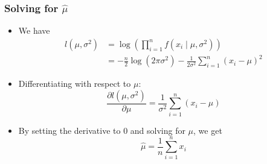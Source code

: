 \documentclass{beamer}
\begin{document}
\begin{frame}
	\frametitle{Solving for $\hat{\mu}$}
	
	
	
	
	\pause
	\begin{itemize}
		\item We have	
		\begin{align*}
			l(\mu, \sigma^2)
			&= \log \left( \prod_{i=1}^{n} f(x_i \mid \mu, \sigma^2) \right)	\\
			&= -\frac{n}{2}\log(2\pi\sigma^2)
			- \frac{1}{2\sigma^2} \sum_{i=1}^{n} (x_i - \mu)^2
		\end{align*}
	\pause
	\item Differentiating with respect to $\mu$:
	$$
	\frac{\partial l(\mu, \sigma^2)}{\partial \mu} = \frac{1}{\sigma^2} \sum_{i=1}^{n} (x_i - \mu)
	$$	
	\pause
	\item By setting the derivative to 0 and solving for $\mu$, we get
	$$
	\hat{\mu} = \frac{1}{n} \sum_{i=1}^{n} x_i
	$$		
		
	\end{itemize}
	
		
	
\end{frame}	

	
	
	
\end{document}

